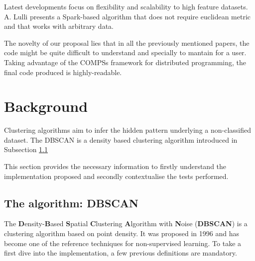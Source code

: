 \documentclass[10pt,journal,compsoc]{IEEEtran}
\begin{document}
Latest developments focus on flexibility and scalability to high feature datasets. A. Lulli \cite{related_5} presents a Spark-based algorithm that does not require euclidean metric and that works with arbitrary data.

The novelty of our proposal lies that in all the previously mentioned papers, the code might be quite difficult to understand and specially to mantain for a user. Taking advantage of the COMPSs framework for distributed programming, the final code produced is highly-readable.







\section{Background} \label{sec:background}


Clustering algorithms aim to infer the hidden pattern underlying a non-classified dataset. The DBSCAN is a density based clustering algorithm introduced in Subsection \ref{sub-sec:the-algorithm}

This section provides the necessary information to firstly understand the implementation proposed and secondly contextualise the tests performed.

\subsection{The algorithm: DBSCAN} \label{sub-sec:the-algorithm}


The \textbf{D}ensity-\textbf{B}ased \textbf{S}patial \textbf{C}lustering \textbf{A}lgorithm with \textbf{N}oise (\textbf{DBSCAN}) is a clustering algorithm based on point density. It was proposed in 1996 \cite{original-paper} and has become one of the reference techniques for non-supervised learning. To take a first dive into the implementation, a few previous definitions are mandatory.
\end{document}
